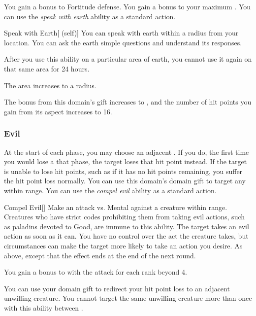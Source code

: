              You gain a  bonus to Fortitude defense.
             You gain a  bonus to your maximum .
             You can use the \textit{speak with earth} ability as a standard action.
            \begin{attuneability}{Speak with Earth}[ (self)]
                You can speak with earth within a \areahuge radius  from your location.
                You can ask the earth simple questions and understand its responses.

                After you use this ability on a particular area of earth, you cannot use it again on that same area for 24 hours.

                \rankline
                 The area increases to a \areagarg radius.
            \end{attuneability}
             The bonus from this domain's gift increases to , and the number of hit points you gain from its aspect increases to 16.

        \subsubsection{Evil}
             At the start of each phase, you may choose an adjacent .
            If you do, the first time you would lose a  that phase, the target loses that hit point instead.
            If the target is unable to lose hit points, such as if it has no hit points remaining, you suffer the hit point loss normally.
             You can use this domain's domain gift to target any  within \rngmed range.
             You can use the \textit{compel evil} ability as a standard action.
            \begin{freeability}{Compel Evil}[]
                Make an attack vs. Mental against a creature within \rngmed range.
                Creatures who have strict codes prohibiting them from taking evil actions, such as paladins devoted to Good, are immune to this ability.
                \hit The target takes an evil action as soon as it can.
                You have no control over the act the creature takes, but circumstances can make the target more likely to take an action you desire.
                \glance As above, except that the effect ends at the end of the next round.

                \rankline
                You gain a  bonus to  with the attack for each rank beyond 4.
            \end{freeability}
             You can use your domain gift to redirect your hit point loss to an adjacent unwilling creature.
            You cannot target the same unwilling creature more than once with this ability between .

